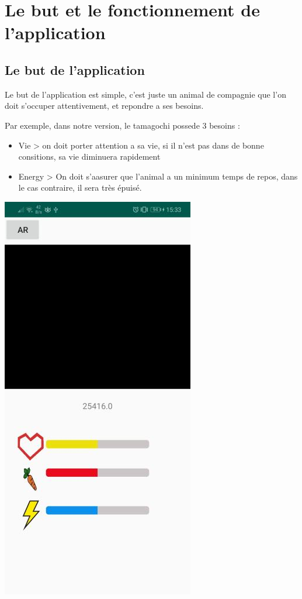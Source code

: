 \documentclass{article}
\begin{document}
\section{Le but et le fonctionnement de l'application}
\subsection{Le but de l'application}

Le but de l'application est simple, c'est juste un animal de compagnie que l'on doit s'occuper attentivement, et repondre a ses besoins.

Par exemple, dans notre version, le tamagochi possede 3 besoins :

\begin{itemize}
    \item Vie > on doit porter attention a sa vie, si il n'est pas dans de bonne consitions, sa vie diminuera rapidement
    \item Energy > On doit s'aasurer que l'animal a un minimum temps de repos, dans le cas contraire, il sera très épuisé.
\end{itemize}

\begin{center}
  \includegraphics[scale=0.5]{tama.jpg}
\end{center}
\end{document}
